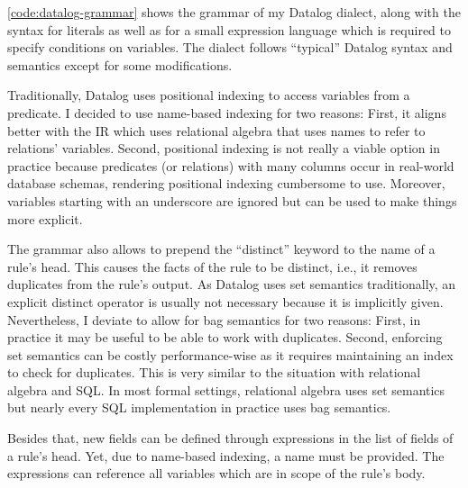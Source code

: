 \ref{code:datalog-grammar} shows the grammar of my Datalog dialect,
along with the syntax for literals as well as for a small expression language
which is required to specify conditions on variables.
The dialect follows ``typical'' Datalog syntax and semantics
except for some modifications.

Traditionally, Datalog uses positional indexing to access variables from a
predicate. I decided to use name-based indexing for two reasons:
First, it aligns better with the \ac{IR} which uses relational algebra
that uses names to refer to relations' variables.
Second, positional indexing is not really a viable option in practice because
predicates (or relations) with many columns occur in real-world
database schemas, rendering positional indexing cumbersome to use.
Moreover, variables starting with an underscore are ignored but can be used
to make things more explicit.

The grammar also allows to prepend the ``distinct'' keyword to the name
of a rule's head.
This causes the facts of the rule to be distinct, i.e., it removes duplicates
from the rule's output.
As Datalog uses set semantics traditionally, an explicit distinct operator
is usually not necessary because it is implicitly given.
Nevertheless, I deviate to allow for bag semantics for two reasons:
First, in practice it may be useful to be able to work with duplicates.
Second, enforcing set semantics can be costly performance-wise
as it requires maintaining an index to check for duplicates.
This is very similar to the situation with relational algebra and SQL.
In most formal settings, relational algebra uses set semantics but nearly
every SQL implementation in practice uses bag semantics.

Besides that, new fields can be defined through expressions in the list of fields
of a rule's head.
Yet, due to name-based indexing, a name must be provided.
The expressions can reference all variables which are in scope of the rule's body.

